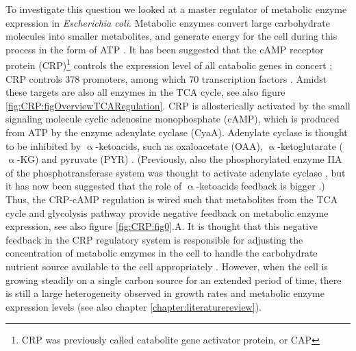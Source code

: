 To investigate this question we looked at a master regulator of metabolic enzyme expression in \textit{Escherichia coli}.
%
Metabolic enzymes convert large carbohydrate molecules into smaller metabolites, and generate energy for the cell during this process in the form of ATP \cite{Nelson2005}.
%
It has been suggested that the cAMP receptor protein (CRP)\footnote{CRP was previously called catabolite gene activator protein, or CAP} 
controls the expression level of all catabolic genes in concert \cite{You2013, Hui2015, Kochanowski2017};
%
CRP controls 378 promoters, among which 70 transcription factors \cite{Green2014, Shimada2011}.
%
Amidst these targets are also all enzymes in the TCA cycle, see also figure \ref{fig:CRP:figOverviewTCARegulation}.
%
CRP is allosterically activated by the small signaling molecule cyclic adenosine monophosphate (cAMP), 
which is produced from ATP by the enzyme adenylate cyclase (CyaA).
Adenylate cyclase is thought to be inhibited by $\upalpha$-ketoacids, such as oxaloacetate (OAA), $\upalpha$-ketoglutarate ($\upalpha$-KG) and pyruvate (PYR) \cite{You2013}.
(Previously, also the phosphorylated enzyme IIA of the phosphotransferase system was thought to activate adenylate cyclase \cite{Keseler2017, Deutscher2008, Gorke2008}, but it has now been suggested that the role of $\upalpha$-ketoacids feedback is bigger \cite{You2013}.)
%
Thus, the CRP-cAMP regulation is wired such that metabolites from the TCA cycle and glycolysis pathway provide negative feedback on metabolic enzyme expression, see also figure \ref{fig:CRP:fig0}.A. 
It is thought that this negative feedback in the CRP regulatory system
is responsible for adjusting the concentration of metabolic enzymes in the cell to handle the carbohydrate nutrient source available to the cell appropriately \cite{Towbin2017}.
%
%
However, when the cell is growing steadily on a single carbon source for an extended period of time, 
there is still a large heterogeneity observed in growth rates and metabolic enzyme expression levels \cite{Kiviet2014} (see also chapter \ref{chapter:literaturereview}).
